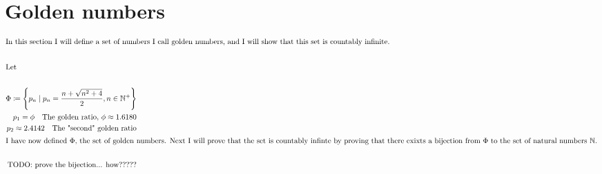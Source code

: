 \documentclass[a4paper]{article}
\begin{document}
\section*{Golden numbers}
\begin{align*}
    \intertext{In this section I will define a set of numbers I call golden numbers, and I will show that this set is countably infinite.}\\
    \intertext{Let}\\
    \Phi \coloneq \left\{p_n \mid p_n=\frac{n+\sqrt{n^2+4}}{2}, n\in\mathbb{N^+}\right\}\\
    p_1=\phi\quad\text{The golden ratio, $\phi\approx 1.6180$}\\
    p_2\approx2.4142\quad\text{The "second" golden ratio}\\
    \intertext{I have now defined $\Phi$, the set of golden numbers. Next I will prove that the set is countably infinte by proving that there exixts a bijection from $\Phi$ to the set of natural numbers $\mathbb{N}$.}\\
    \text{TODO: prove the bijection... how?????}
\end{align*}
\end{document}
